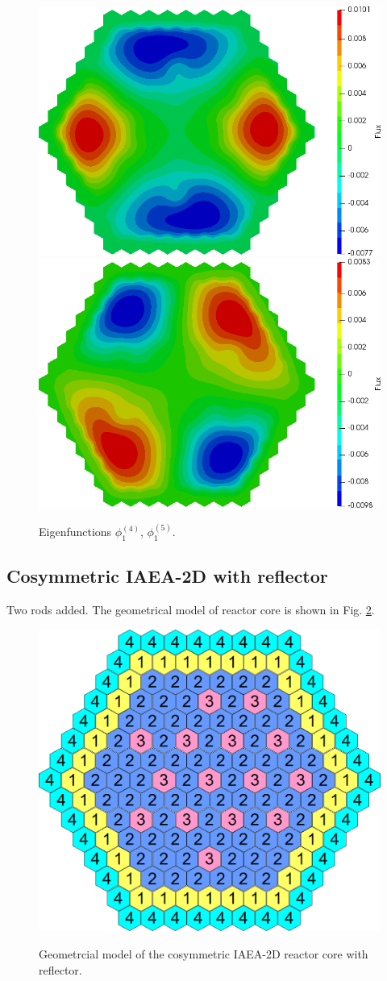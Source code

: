 \documentclass[authoryear]{elsarticle}
\begin{document}
\begin{figure}[h]
\begin{center}
	\includegraphics[width=0.49\linewidth]{iaea_with/alpha_delayed_sp3_u1_4.png}
	\includegraphics[width=0.49\linewidth]{iaea_with/alpha_delayed_sp3_u1_5.png}\\
	\caption{Eigenfunctions $\phi_1^{(4)}$, $\phi_1^{(5)}$.}
	\label{fig:iaea_with_fun_del_3}
\end{center}
\end{figure}

\subsection{Cosymmetric IAEA-2D with reflector}
Two rods added.
The geometrical model of reactor core is shown in Fig. \ref{fig:iaea_cosym}. 

\begin{figure}[h]
\begin{center}
	\includegraphics[width=0.6\linewidth]{iaea_cosym.png}\\
	\caption{Geometrcial model of the cosymmetric IAEA-2D reactor core with reflector.}
	\label{fig:iaea_cosym}
\end{center}
\end{figure}
\end{document}
